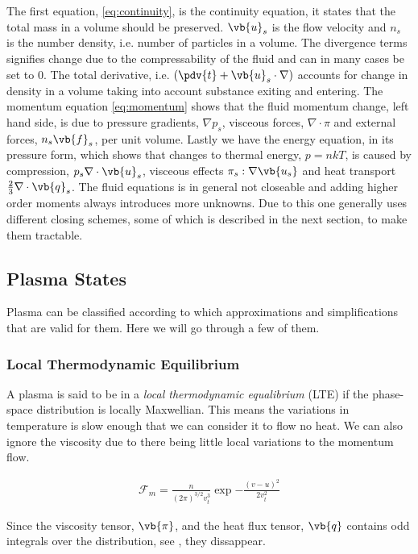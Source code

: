 	The first equation, \cref{eq:continuity}, is the continuity equation, it states that the total mass
	in a volume	should be preserved. \(\vb{u}_s\) is the flow velocity and \(n_s\) is the number density, i.e.
	number of particles in a volume. The divergence terms signifies change due to the compressability of the fluid
	and can in many cases be set to \(0\). The total derivative, i.e. \(\left(\pdv{t} + \vb{u}_s\cdot\nabla \right)\) accounts for
	change in density in a volume taking into account substance exiting and entering.
	The momentum equation \cref{eq:momentum} shows that the fluid momentum change, left hand side,
	is due to pressure gradients, \(\nabla p_s\), visceous forces, \(\nabla \cdot \pi \) and external forces, \(n_s\vb{f}_s\),
	per unit volume.
	Lastly we have the energy equation, in its pressure form, which shows that changes to thermal
	energy, \(p = nkT\), is caused by compression, \(p_s\nabla \cdot \vb{u}_s\), visceous effects \(\pi_s : \nabla{\vb{u_s}}\)
	and heat transport	\(\frac{2}{3}\nabla \cdot \vb{q}_s\).
	The fluid equations is in general not closeable and adding higher order moments
	always introduces more unknowns. Due to this one generally uses different closing
	schemes, some of which is described in the next section, to make them tractable.

\subsection{Plasma States}
	Plasma can be classified according to which	approximations and simplifications
	that are valid for them. Here we will go through a few of them.

	\subsubsection{Local Thermodynamic Equilibrium}
	A plasma is said to be in a \textit{local thermodynamic equalibrium} (LTE)
	if the phase-space distribution is locally Maxwellian. This means the variations
	in temperature is slow enough that we can consider it to flow no heat. We can also ignore
	the viscosity due to there being little local variations to the momentum flow.

	\begin{align}
		\mathcal{F}_m = \frac{n}{(2\pi )^{3/2}v_t^3} \exp{-\frac{(v-u)^2}{2v_t^2}}
	\end{align}

	Since the viscosity tensor, \(\vb{\pi}\), and the heat flux tensor, \(\vb{q}\)
	contains odd integrals over the distribution, see \citet{fitzpatrick_plasma_2014},
	they dissappear.

